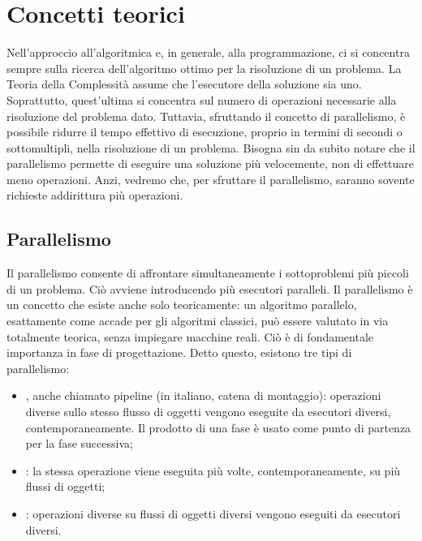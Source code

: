 \chapter{Concetti teorici}
Nell'approccio all'algoritmica e, in generale, alla programmazione, ci si concentra sempre sulla ricerca dell'algoritmo ottimo per la risoluzione di un problema. 
La Teoria della Complessità assume che l'esecutore della soluzione sia uno. 
Soprattutto, quest'ultima si concentra sul numero di operazioni necessarie alla risoluzione del problema dato. 
Tuttavia, sfruttando il concetto di parallelismo, è possibile ridurre il tempo effettivo di esecuzione, proprio in termini di secondi o sottomultipli, nella risoluzione di un problema. 
Bisogna sin da subito notare che il parallelismo permette di eseguire una soluzione più velocemente, non di effettuare meno operazioni. Anzi, vedremo che, per sfruttare il parallelismo, saranno sovente richieste addirittura più operazioni.

\section{Parallelismo}
Il parallelismo consente di affrontare simultaneamente i sottoproblemi più piccoli di un problema. Ciò avviene introducendo più esecutori paralleli. 
Il parallelismo è un concetto che esiste anche solo teoricamente: un algoritmo parallelo, esattamente come accade per gli algoritmi classici, può essere valutato in via totalmente teorica, senza impiegare macchine reali. 
Ciò è di fondamentale importanza in fase di progettazione.
Detto questo, esistono tre tipi di parallelismo:
\begin{itemize}
  \item {}, anche chiamato pipeline (in italiano, catena di montaggio): operazioni diverse sullo stesso flusso di oggetti vengono eseguite da esecutori diversi, contemporaneamente. Il prodotto di una fase è usato come punto di partenza per la fase successiva;
  \item {}: la stessa operazione viene eseguita più volte, contemporaneamente, su più flussi di oggetti;
  \item {}: operazioni diverse su flussi di oggetti diversi vengono eseguiti da esecutori diversi.
\end{itemize}

